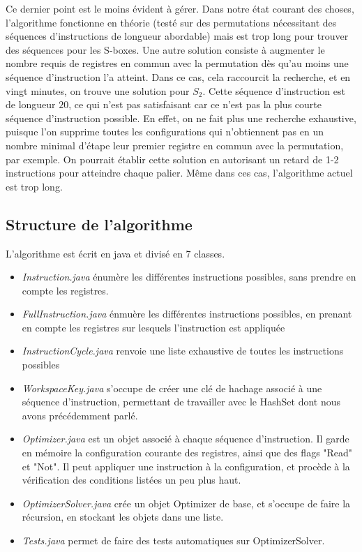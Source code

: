 \documentclass{article}
\begin{document}
Ce dernier point est le moins évident à gérer. Dans notre état courant des choses, l'algorithme fonctionne en théorie (testé sur des permutations nécessitant des séquences d'instructions de longueur abordable) mais est trop long pour trouver des séquences pour les S-boxes. Une autre solution consiste à augmenter le nombre requis de registres en commun avec la permutation dès qu'au moins une séquence d'instruction l'a atteint. Dans ce cas, cela raccourcit la recherche, et en vingt minutes, on trouve une solution pour $S_2$. Cette séquence d'instruction est de longueur $20$, ce qui n'est pas satisfaisant car ce n'est pas la plus courte séquence d'instruction possible. En effet, on ne fait plus une recherche exhaustive, puisque l'on supprime toutes les configurations qui n'obtiennent pas  en un nombre minimal d'étape leur premier registre en commun avec la permutation, par exemple. On pourrait établir cette solution en autorisant un retard de 1-2 instructions pour atteindre chaque palier. Même dans ces cas, l'algorithme actuel est trop long.

\subsection{Structure de l'algorithme}

L'algorithme est écrit en java et divisé en 7 classes.
\medbreak
\begin{itemize}
\setlength\itemsep{1em}
\item \textit{Instruction.java} énumère les différentes instructions possibles, sans prendre en compte les registres.
\item \textit{FullInstruction.java} énmuère les différentes instructions possibles, en prenant en compte les registres sur lesquels l'instruction est appliquée
\item \textit{InstructionCycle.java} renvoie une liste exhaustive de toutes les instructions possibles
\item \textit{WorkspaceKey.java} s'occupe de créer une clé de hachage associé à une séquence d'instruction, permettant de travailler avec le HashSet dont nous avons précédemment parlé.
\item \textit{Optimizer.java} est un objet associé à chaque séquence d'instruction. Il garde en mémoire la configuration courante des registres, ainsi que des flags "Read" et "Not". Il peut appliquer une instruction à la configuration, et procède à la vérification des conditions listées un peu plus haut.
\item \textit{OptimizerSolver.java} crée un objet Optimizer de base, et s'occupe de faire la récursion, en stockant les objets dans une liste.
\item \textit{Tests.java} permet de faire des tests automatiques sur OptimizerSolver.
 
\end{itemize}
\end{document}
